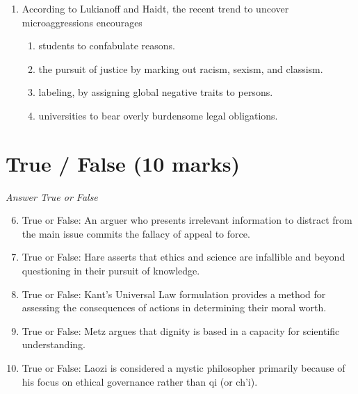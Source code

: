 \documentclass[12pt]{article}
\begin{document}
\begin{enumerate}[label=\arabic*.]
\begin{enumerate}[label=(\alph*)]
    \item Completely unrelated in any way
    \item Similar in some ways, different in others
    \item Similar in appearance, but not in function
    \item Sufficiently similar
    \item Not sufficiently similar in relevant ways
\end{enumerate}
\item According to Lukianoff and Haidt, the recent trend to uncover microaggressions encourages
\begin{enumerate}[label=(\alph*)]
    \item students to confabulate reasons.
    \item the pursuit of justice by marking out racism, sexism, and classism.
    \item labeling, by assigning global negative traits to persons.
    \item universities to bear overly burdensome legal obligations.
\end{enumerate}
\end{enumerate}

\section*{True / False (10 marks)}
\textit{Answer True or False}
\begin{enumerate}[label=\arabic*.]
\setcounter{enumi}{5}
\item True or False: An arguer who presents irrelevant information to distract from the main issue commits the fallacy of appeal to force.
\item True or False: Hare asserts that ethics and science are infallible and beyond questioning in their pursuit of knowledge.
\item True or False: Kant's Universal Law formulation provides a method for assessing the consequences of actions in determining their moral worth.
\item True or False: Metz argues that dignity is based in a capacity for scientific understanding.
\item True or False: Laozi is considered a mystic philosopher primarily because of his focus on ethical governance rather than qi (or ch'i).
\end{enumerate}
\end{document}
